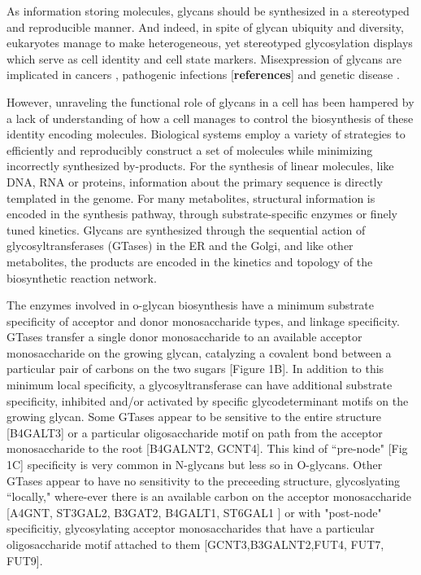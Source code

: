 \documentclass[twocolumn]{article}
\begin{document}
As information storing molecules, glycans should be synthesized in a stereotyped and reproducible manner. And indeed, in spite of glycan ubiquity and diversity, eukaryotes manage to make heterogeneous, yet stereotyped glycosylation displays which serve as cell identity and cell state markers. Misexpression of glycans are implicated in cancers \cite{Vankemmelbeke2016, Lloyd1996}, pathogenic infections [\textbf{references}] and genetic disease \cite{Freeze2011}.

However, unraveling the functional role of glycans in a cell has been hampered by a lack of understanding of how a cell manages to control the biosynthesis of these identity encoding molecules. Biological systems employ a variety of strategies to efficiently and reproducibly construct a set of molecules while minimizing incorrectly synthesized by-products. For the synthesis of linear molecules, like DNA, RNA or proteins, information about the primary sequence is directly templated in the genome. For many metabolites, structural information is encoded in the synthesis pathway, through substrate-specific enzymes or finely tuned kinetics. Glycans are synthesized through the sequential action of glycosyltransferases (GTases) in the ER and the Golgi, and like other metabolites, the products are encoded in the kinetics and topology of the biosynthetic reaction network.

The enzymes involved in o-glycan biosynthesis have a minimum substrate specificity of acceptor and donor monosaccharide types, and linkage specificity. GTases transfer a single donor monosaccharide to an available acceptor monosaccharide on the growing glycan, catalyzing a covalent bond between a particular pair of carbons on the two sugars [Figure 1B]. In addition to this minimum local specificity, a glycosyltransferase can have additional substrate specificity, inhibited and/or activated by specific glycodeterminant motifs on the growing glycan. Some GTases appear to be sensitive to the entire structure [B4GALT3] or a particular oligosaccharide motif on path from the acceptor monosaccharide to the root [B4GALNT2, GCNT4]. This kind of ``pre-node" [Fig 1C] specificity is very common in N-glycans but less so in O-glycans.  Other GTases appear to have no sensitivity to the preceeding structure, glycoslyating ``locally," where-ever there is an available carbon on the acceptor monosaccharide [A4GNT, ST3GAL2, B3GAT2, B4GALT1, ST6GAL1  \cite{Blixt2008}] or with "post-node" specificitiy, glycosylating acceptor monosaccharides that have a particular oligosaccharide motif attached to them [GCNT3,B3GALNT2,FUT4, FUT7, FUT9]. 
\end{document}
